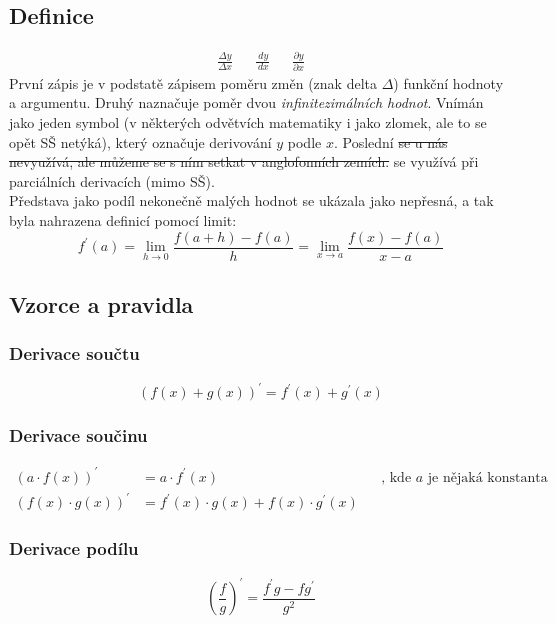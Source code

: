 \documentclass[12pt]{article}
\begin{document}
\subsection{Definice}
\begin{align}
\frac{\Delta y}{\Delta x} && \frac{\,dy}{\,dx} && \frac{\partial y}{\partial x}
\end{align}
První zápis je v podstatě zápisem poměru změn (znak delta $\Delta$) funkční hodnoty a argumentu. Druhý naznačuje poměr dvou \emph{infinitezimálních hodnot}. Vnímán jako jeden symbol (v některých odvětvích matematiky i jako zlomek, ale to se opět SŠ netýká), který označuje derivování $y$ podle $x$. Poslední \st{se u nás nevyužívá, ale můžeme se s ním setkat v anglofonních zemích.} se využívá při parciálních derivacích (mimo SŠ).\\
Představa jako podíl nekonečně malých hodnot se ukázala jako nepřesná, a tak byla nahrazena definicí pomocí limit:
\begin{equation}
f^{\prime}(a) = \lim_{h \to 0} \frac{f(a+h)-f(a)}{h} = \lim_{x \to a} \frac{f(x)-f(a)}{x-a}
\end{equation}

\subsection{Vzorce a pravidla}
\subsubsection{Derivace součtu}
\begin{equation}
(f(x) + g(x))^\prime = f^{\prime}(x) + g^{\prime}(x)
\end{equation}
\subsubsection{Derivace součinu}
\label{sec:der_soucin}
\begin{align}
(a \cdot f(x))^\prime &= a \cdot f^{\prime}(x) && \text{, kde $a$ je nějaká konstanta}\\
(f(x) \cdot g(x))^\prime &= f^{\prime}(x) \cdot g(x) + f(x) \cdot g^{\prime}(x) 
\end{align}
\subsubsection{Derivace podílu}
\begin{equation}
\left(\frac{f}{g}\right)^{\prime} = \frac{f^{\prime}g-fg^{\prime}}{g^{2}}
\end{equation}
\end{document}
